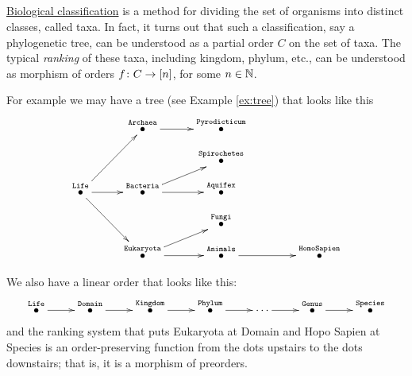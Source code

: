 \begin{exerciseRUS}
\end{exerciseRUS}


\subsection{}


\subsubsection{}

\begin{blockENG}
\href{http://en.wikipedia.org/wiki/Biological_classification}{\text Biological classification} is a method for dividing the set of organisms into distinct classes, called taxa. In fact, it turns out that such a classification, say a phylogenetic tree, can be understood as a partial order $C$ on the set of taxa. The typical {\em ranking} of these taxa, including kingdom, phylum, etc., can be understood as morphism of orders $f\colon C\rightarrow [n]$, for some $n\in{\mathbb N}$. 
\end{blockENG}

\begin{blockRUS}
\end{blockRUS}

\begin{blockENG}
For example we may have a tree (see Example \ref{ex:tree}) that looks like this 
$$
\xymatrix@=10pt{
&&\LTO{Archaea}\ar[rr]&&\LTO{Pyrodicticum}\\
&&&&\LTO{Spirochetes}\\
\LTO{Life}\ar[rr]\ar[ddrr]\ar[uurr]&&\LTO{Bacteria}\ar[rr]\ar[rru]&&\LTO{Aquifex}\\
&&&&\LTO{Fungi}\\
&&\LTO{Eukaryota}\ar[rr]\ar[urr]&&\LTO{Animals}\ar[rrr]&&&\LTO{Homo Sapien}}
$$
\end{blockENG}

\begin{blockRUS}
\end{blockRUS}

\begin{blockENG}
We also have a linear order that looks like this:
$$
\xymatrix{\LTO{Life}\ar[r]&\LTO{Domain}\ar[r]&\LTO{Kingdom}\ar[r]&\LTO{Phylum}\ar[r]&\cdots\ar[r]&\LTO{Genus}\ar[r]&\LTO{Species}}
$$
and the ranking system that puts Eukaryota at Domain and Hopo Sapien at Species is an order-preserving function from the dots upstairs to the dots downstairs; that is, it is a morphism of preorders.
\end{blockENG}

